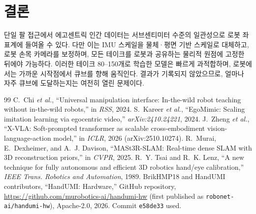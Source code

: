 \documentclass[conference,10pt]{IEEEtran}
\begin{document}
\section{결론}
단일 팔 접근에서 에고센트릭 인간 데이터는 서브센티미터 수준의 일관성으로 로봇 좌표계에 들여올 수 있다. 다만 이는 IMU
스케일을 물체·평면 기반 스케일로 대체하고, 로봇 손목 카메라를 보정하며, 모든 테이크를 로봇과 공유하는 물리적 원점에
고정한 뒤에야 가능하다. 이러한 테이크 80--150개로 학습한 모델은 빠르게 과적합하며, 로봇에서는 가까운 시작점에서 큐브를
향해 움직인다. 결과가 기록되지 않았으므로, 얼마나 자주 큐브에 도달하는지는 여전히 열린 문제이다.

\begin{thebibliography}{99}\footnotesize
{} C.~Chi \emph{et al.}, ``Universal manipulation interface: In-the-wild robot teaching without in-the-wild robots,'' in \emph{RSS}, 2024.
 S.~Kareer \emph{et al.}, ``EgoMimic: Scaling imitation learning via egocentric video,'' \emph{arXiv:2410.24221}, 2024.
 J.~Zheng \emph{et al.}, ``X-VLA: Soft-prompted transformer as scalable cross-embodiment vision-language-action model,'' in \emph{ICLR}, 2026 (arXiv:2510.10274).
 R.~Murai, E.~Dexheimer, and A.~J. Davison, ``MASt3R-SLAM: Real-time dense SLAM with 3D reconstruction priors,'' in \emph{CVPR}, 2025.
 R.~Y. Tsai and R.~K. Lenz, ``A new technique for fully autonomous and efficient 3D robotics hand/eye calibration,'' \emph{IEEE Trans. Robotics and Automation}, 1989.
 BrikHMP18 and HandUMI contributors, ``HandUMI: Hardware,'' GitHub repository, \url{https://github.com/murobotics-ai/handumi-hw} (first published as \texttt{robonet-ai/handumi-hw}), Apache-2.0, 2026. Commit \texttt{e58de33} used.
\end{thebibliography}
\end{document}
